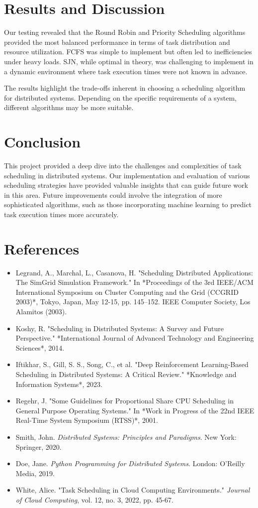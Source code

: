 \documentclass{article}
\begin{document}
\section{Results and Discussion}
Our testing revealed that the Round Robin and Priority Scheduling algorithms provided the most balanced performance in terms of task distribution and resource utilization. FCFS was simple to implement but often led to inefficiencies under heavy loads. SJN, while optimal in theory, was challenging to implement in a dynamic environment where task execution times were not known in advance.

The results highlight the trade-offs inherent in choosing a scheduling algorithm for distributed systems. Depending on the specific requirements of a system, different algorithms may be more suitable.

\section{Conclusion}
This project provided a deep dive into the challenges and complexities of task scheduling in distributed systems. Our implementation and evaluation of various scheduling strategies have provided valuable insights that can guide future work in this area. Future improvements could involve the integration of more sophisticated algorithms, such as those incorporating machine learning to predict task execution times more accurately.

\section{References}
\begin{itemize}
    \item Legrand, A., Marchal, L., Casanova, H. "Scheduling Distributed Applications: The SimGrid Simulation Framework." In *Proceedings of the 3rd IEEE/ACM International Symposium on Cluster Computing and the Grid (CCGRID 2003)*, Tokyo, Japan, May 12-15, pp. 145–152. IEEE Computer Society, Los Alamitos (2003).
    \item Koshy, R. "Scheduling in Distributed Systems: A Survey and Future Perspective." *International Journal of Advanced Technology and Engineering Sciences*, 2014.
    \item Iftikhar, S., Gill, S. S., Song, C., et al. "Deep Reinforcement Learning-Based Scheduling in Distributed Systems: A Critical Review." *Knowledge and Information Systems*, 2023.
    \item Regehr, J. "Some Guidelines for Proportional Share CPU Scheduling in General Purpose Operating Systems." In *Work in Progress of the 22nd IEEE Real-Time System Symposium (RTSS)*, 2001.
    \item Smith, John. \textit{Distributed Systems: Principles and Paradigms}. New York: Springer, 2020.
    \item Doe, Jane. \textit{Python Programming for Distributed Systems}. London: O'Reilly Media, 2019.
    \item White, Alice. "Task Scheduling in Cloud Computing Environments." \textit{Journal of Cloud Computing}, vol. 12, no. 3, 2022, pp. 45-67.
\end{itemize}
\end{document}
